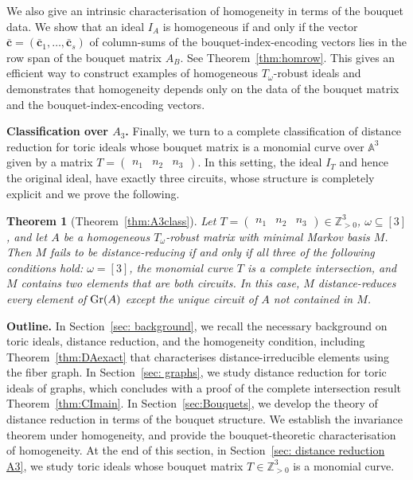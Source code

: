 \documentclass[a4paper, 12pt]{article}
\newcommand{\ZZ}{\mathbb Z}
\theoremstyle{plain}
\newtheorem*{theorem*}{Theorem}
\theoremstyle{definition}
\theoremstyle{remark}
\begin{document}
We also give an intrinsic characterisation of homogeneity in terms of the bouquet data. 
We show that an ideal $I_A$ is homogeneous if and only if the vector $\mathbf{\bar{c}} = (\mathbf{\bar{c}}_1, \dots, \mathbf{\bar{c}}_s)$ of column-sums of the bouquet-index-encoding vectors lies in the row span of the bouquet matrix $A_B$. See Theorem~\ref{thm:homrow}. This gives an efficient way to construct examples of homogeneous $T_{\omega}$-robust ideals and demonstrates that homogeneity depends only on the data of the bouquet matrix and the bouquet-index-encoding vectors.



\medskip \noindent
\textbf{Classification over $A_3$.} Finally, we turn to a complete classification of distance reduction for toric ideals whose bouquet matrix is a monomial curve over $\mathbb{A}^3$ given by a matrix $T = \begin{pmatrix} n_1 & n_2 & n_3 \end{pmatrix}$. 
In this setting, the ideal $I_T$ and hence the original ideal, have exactly three circuits, whose structure is completely explicit and we prove the following.
 
\begin{theorem*}[Theorem~\ref{thm:A3class}]
	Let $T = \begin{pmatrix} n_1 & n_2 & n_3 \end{pmatrix} \in \ZZ_{>0}^3$, $\omega \subseteq [3]$, and let $A$ be a homogeneous $T_\omega$-robust matrix with minimal Markov basis $M$. Then $M$ fails to be distance-reducing if and only if all three of the following conditions hold: $\omega = [3]$, the monomial curve $T$ is a complete intersection, and $M$ contains two elements that are both circuits. In this case, $M$ distance-reduces every element of ${\rm Gr}(A)$ except the unique circuit of $A$ not contained in $M$.
\end{theorem*}


\medskip \noindent
\textbf{Outline.} In Section~\ref{sec: background}, we recall the necessary background on toric ideals, distance reduction, and the homogeneity condition, including Theorem~\ref{thm:DAexact} that characterises distance-irreducible elements using the fiber graph. 
In Section~\ref{sec: graphs}, we study distance reduction for toric ideals of graphs, which concludes with a proof of the complete intersection result Theorem~\ref{thm:CImain}. 
In Section~\ref{sec:Bouquets}, we develop the theory of distance reduction in terms of the bouquet structure. We establish the invariance theorem under homogeneity, and provide the bouquet-theoretic
characterisation of homogeneity. At the end of this section, in Section~\ref{sec: distance reduction A3}, we study toric ideals whose bouquet matrix $T \in \mathbb{Z}_{>0}^3$ is a monomial curve.
\end{document}
